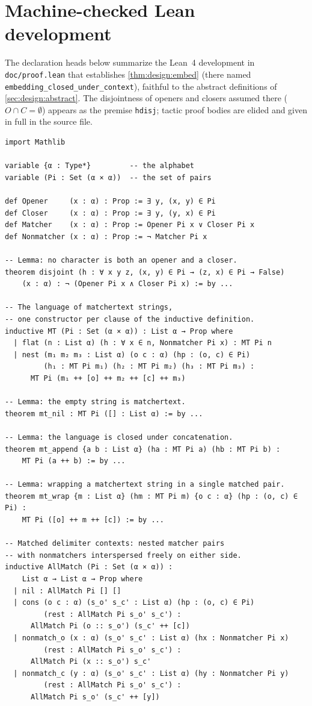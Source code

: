 \section{Machine-checked Lean development}
\label{app:lean}

The declaration heads below summarize the Lean~4 development in
\texttt{doc/proof.lean} that establishes \cref{thm:design:embed}
(there named \texttt{embedding\_closed\_under\_context}),
faithful to the abstract definitions of \cref{sec:design:abstract}.
The disjointness of openers and closers assumed there ($O \cap C = \emptyset$)
appears as the premise \texttt{hdisj};
tactic proof bodies are elided and given in full in the source file.

\begin{lstlisting}
import Mathlib

variable {α : Type*}         -- the alphabet
variable (Pi : Set (α × α))  -- the set of pairs

def Opener     (x : α) : Prop := ∃ y, (x, y) ∈ Pi
def Closer     (x : α) : Prop := ∃ y, (y, x) ∈ Pi
def Matcher    (x : α) : Prop := Opener Pi x ∨ Closer Pi x
def Nonmatcher (x : α) : Prop := ¬ Matcher Pi x

-- Lemma: no character is both an opener and a closer.
theorem disjoint (h : ∀ x y z, (x, y) ∈ Pi → (z, x) ∈ Pi → False)
    (x : α) : ¬ (Opener Pi x ∧ Closer Pi x) := by ...

-- The language of matchertext strings,
-- one constructor per clause of the inductive definition.
inductive MT (Pi : Set (α × α)) : List α → Prop where
  | flat (n : List α) (h : ∀ x ∈ n, Nonmatcher Pi x) : MT Pi n
  | nest (m₁ m₂ m₃ : List α) (o c : α) (hp : (o, c) ∈ Pi)
         (h₁ : MT Pi m₁) (h₂ : MT Pi m₂) (h₃ : MT Pi m₃) :
      MT Pi (m₁ ++ [o] ++ m₂ ++ [c] ++ m₃)

-- Lemma: the empty string is matchertext.
theorem mt_nil : MT Pi ([] : List α) := by ...

-- Lemma: the language is closed under concatenation.
theorem mt_append {a b : List α} (ha : MT Pi a) (hb : MT Pi b) :
    MT Pi (a ++ b) := by ...

-- Lemma: wrapping a matchertext string in a single matched pair.
theorem mt_wrap {m : List α} (hm : MT Pi m) {o c : α} (hp : (o, c) ∈ Pi) :
    MT Pi ([o] ++ m ++ [c]) := by ...

-- Matched delimiter contexts: nested matcher pairs
-- with nonmatchers interspersed freely on either side.
inductive AllMatch (Pi : Set (α × α)) :
    List α → List α → Prop where
  | nil : AllMatch Pi [] []
  | cons (o c : α) (s_o' s_c' : List α) (hp : (o, c) ∈ Pi)
         (rest : AllMatch Pi s_o' s_c') :
      AllMatch Pi (o :: s_o') (s_c' ++ [c])
  | nonmatch_o (x : α) (s_o' s_c' : List α) (hx : Nonmatcher Pi x)
         (rest : AllMatch Pi s_o' s_c') :
      AllMatch Pi (x :: s_o') s_c'
  | nonmatch_c (y : α) (s_o' s_c' : List α) (hy : Nonmatcher Pi y)
         (rest : AllMatch Pi s_o' s_c') :
      AllMatch Pi s_o' (s_c' ++ [y])


\end{lstlisting}
